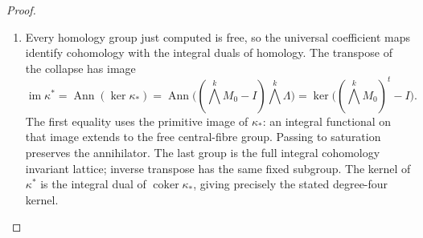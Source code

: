 \documentclass[11pt,a4paper]{article}
\numberwithin{equation}{section}
\theoremstyle{definition}
\begin{document}
\begin{proof}
\begin{enumerate}[label=\arabic*.]
\item Every homology group just computed is free, so the universal
coefficient maps identify cohomology with the integral duals of homology.
The transpose of the collapse has image
\[
 \operatorname{im}\kappa^*
 =\operatorname{Ann}(\ker\kappa_*)
 =\operatorname{Ann}\bigl((\bigwedge^kM_0-I)\bigwedge^k\Lambda\bigr)
 =\ker\bigl((\bigwedge^kM_0)^t-I\bigr).
\]
The first equality uses the primitive image of $\kappa_*$: an integral
functional on that image extends to the free central-fibre group.
Passing to saturation preserves the annihilator. The last group is
the full integral cohomology invariant lattice; inverse transpose
has the same fixed subgroup. The kernel of $\kappa^*$ is the
integral dual of $\operatorname{coker}\kappa_*$, giving precisely the
stated degree-four kernel.
\end{enumerate}
\end{proof}
\end{document}
